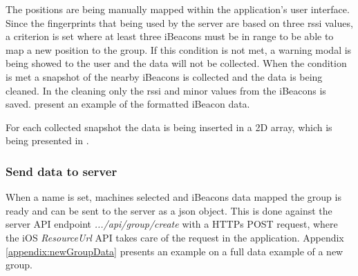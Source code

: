 \bigskip

The positions are being manually mapped within the application's user interface.
Since the fingerprints that being used by the server are based on three \acrshort{rssi} values, a criterion is set where at least three iBeacons must be in range to be able to map a new position to the group.
If this condition is not met, a warning modal is being showed to the user and the data will not be collected.
When the condition is met a snapshot of the nearby iBeacons is collected and the data is being cleaned.
In the cleaning only the \acrshort{rssi} and minor values from the iBeacons is saved.
 present an example of the formatted iBeacon data.


For each collected snapshot the data is being inserted in a 2D array, which is being presented in .



\subsubsection{Send data to server}\label{sec:implAppnewGroupSend}
When a name is set, machines selected and iBeacons data mapped the group is ready and can be sent to the server as a \acrfull{json} object.
This is done against the server API endpoint \textit{.../api/group/create} with a HTTPs POST request, where the iOS \textit{ResourceUrl} API takes care of the request in the application.
Appendix \ref{appendix:newGroupData} presents an example on a full data example of a new group.
